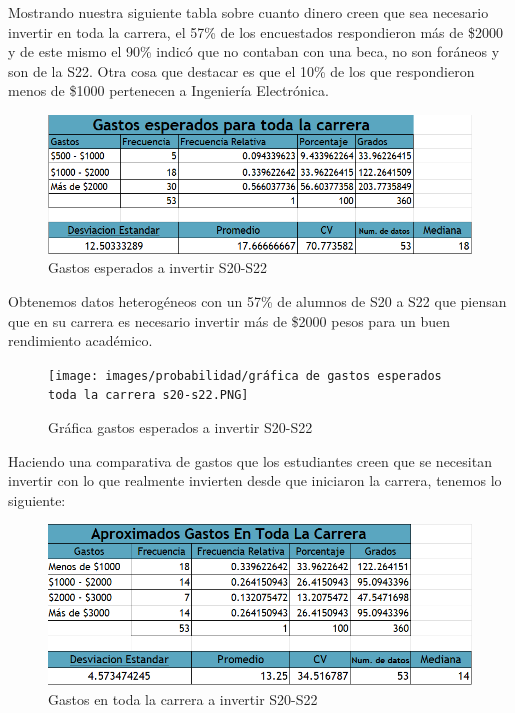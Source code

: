 \documentclass[letterpaper,12pt]{article}
\begin{document}
\begin{sloppypar}
Mostrando nuestra siguiente tabla sobre cuanto dinero creen que sea necesario invertir en toda la carrera, el 57\% de los encuestados respondieron más de \$2000 y de este mismo el 90\% indicó que no contaban con una beca, no son foráneos y son de la S22. Otra cosa que destacar es que el 10\% de los que respondieron menos de \$1000 pertenecen a Ingeniería Electrónica. 

\begin{figure}[H]
    \centering
    \includegraphics[width=0.9 \textwidth]{images/probabilidad/Tabla de frecuencia general de gastos esperados toda la carrera s20-s22.PNG}
    \caption{Gastos esperados a invertir S20-S22}
\end{figure}

Obtenemos datos heterogéneos con un 57\% de alumnos de S20 a S22 que piensan que en su carrera es necesario invertir más de \$2000 pesos para un buen rendimiento académico.

\begin{figure}[H]
    \centering
    \texttt{[image: images/probabilidad/gráfica de gastos esperados toda la carrera s20-s22.PNG]}
    \caption{Gráfica gastos esperados a invertir S20-S22}
\end{figure}

Haciendo una comparativa de gastos que los estudiantes creen que se necesitan invertir con lo que realmente invierten desde que iniciaron la carrera, tenemos lo siguiente:

\begin{figure}[H]
    \centering
    \includegraphics[width=0.9 \textwidth]{images/probabilidad/Tabla de frecuencia general de gastos aprox toda la carrera s20-s22.PNG}
    \caption{Gastos en toda la carrera a invertir S20-S22}
\end{figure}


\end{sloppypar}
\end{document}
